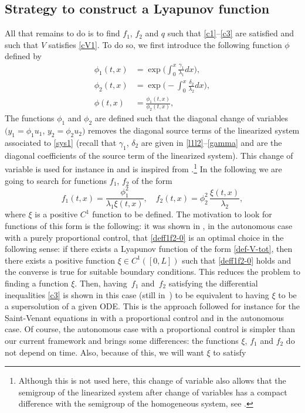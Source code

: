 \subsection{Strategy to construct a Lyapunov function}
{A}ll that remains to do is to find $f_{1}$, $f_{2}$ and $q$ such that \eqref{c1}--\eqref{c3} are satisfied and such that $V$ satisfies \eqref{cV1}.
{To do so, we} first introduce the following function $\phi$ defined by
\begin{equation}
\begin{split}
\phi_{1}(t,x)&=\exp\biggl(\int_{0}^{x}\frac{\gamma_{1}}{\lambda_{1}}dx\biggr),\\
\phi_{2}(t,x)&=\exp\biggl(-\int_{0}^{x}\frac{\delta_{2}}{\lambda_{2}}dx\biggr),\\
\phi(t,x)&=\frac{\phi_{1}(t,x)}{\phi_{2}(t,x)},
\end{split}
\label{phi}
\end{equation}
The functions $\phi_{1}$ and $\phi_{2}$ are defined such that the diagonal change of variables $(y_{1} = \phi_{1}u_{1}$, $y_{2}= \phi_{2}u_{2})$ removes the diagonal source terms of the linearized system associated to \eqref{sys1} (recall that $\gamma_{1}$, $\delta_{2}$ are given in \eqref{l1l2}--\eqref{gamma} and are the diagonal coefficients of the source term of the linearized system). This change of variable is used for instance in \cite{BastinCoron22,C1_22} and is inspired from \cite[Chap.\,9]{KrsticBook}.\footnote{Although this is not used here, this change of variable also allows that the semigroup of the linearized system after change of variables has a compact difference with the semigroup of the homogeneous system, see \cite{hu2021minimal}.} In the following we are going to search for functions $f_{1}$, $f_{2}$ of the form
\begin{equation}
f_{1}(t,x)=\frac{\phi^{2}_{1}}{\lambda_{1}\xi(t,x)},\quad f_{2}(t,x)=\phi_{2}^{2}\,\frac{\xi(t,x)}{\lambda_{2}},
\label{deff1f2-0}
\end{equation}
where $\xi$ is a positive $C^{1}$ function to be defined. The motivation to look for functions of this form is the following: it was shown in \cite{BastinCoron22}, in the autonomous case with a purely proportional control, that \eqref{deff1f2-0} is an optimal choice in the following sense: if there exists a Lyapunov function of the form \eqref{def-V-tot}, then there exists a positive function $\xi\in C^{1}([0,L])$ such that \eqref{deff1f2-0} holds and the converse is true for suitable boundary conditions. This reduces the problem to finding a function $\xi$. Then, having~$f_{1}$ and~$f_{2}$ satisfying the differential inequalities \eqref{c3} is shown in this case (still in~\cite{BastinCoron22}) to be equivalent to having $\xi$ to be a supersolution of a given ODE. This is the approach followed for instance for the Saint-Venant equations in \cite{BC2017,HS} with a proportional control and in the autonomous case. Of course, the autonomous case with a proportional control is simpler than our current framework and brings some differences: the functions $\xi$, $f_{1}$ and $f_{2}$ do not depend on time. Also, because of this, we will want $\xi$ to satisfy
